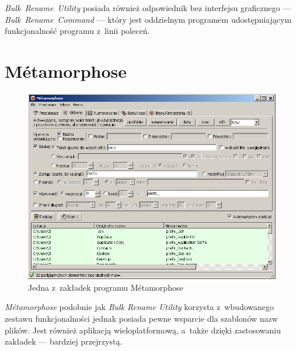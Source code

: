 \textit{Bulk~Rename~Utility} posiada również odpowiednik bez interfejsu graficznego --- \textit{Bulk~Rename~Command} --- który jest oddzielnym programem udostępniającym funkcjonalność programu z~linii poleceń.

\section{Métamorphose}
\begin{figure}[h]
\begin{center}
\includegraphics[scale=0.75]{img/metamorphose_window.png}
\end{center}
\caption{Jedna z~zakładek programu Métamorphose}
\end{figure}

\par
\textit{Métamorphose} podobnie jak \textit{Bulk Rename Utility} korzysta z~wbudowanego zestawu funkcjonalności jednak posiada pewne wsparcie dla szablonów nazw plików. Jest również aplikacją wieloplatformową, a~także dzięki zastosowaniu zakładek --- bardziej przejrzystą.


